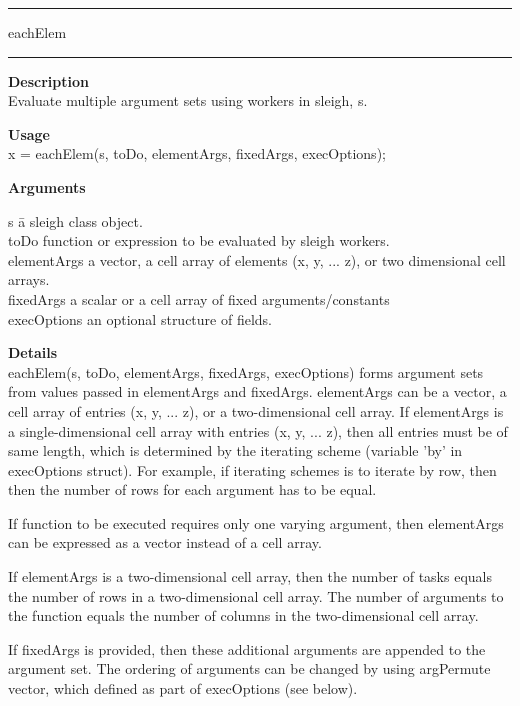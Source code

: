 \rule[0.06in]{6in}{0.01in}
\newline
eachElem
\newline
\rule{6in}{0.01in}
\begin{list}{}{}
	\item {\bf Description}\\
	Evaluate multiple argument sets using workers in sleigh, s. 
	\item {\bf Usage\\}
	x = eachElem(s, toDo, elementArgs, fixedArgs, execOptions);
	\item {\bf Arguments}
		\begin{tabbing}
		s \hspace{2.5cm} \= a sleigh class object.\\
		toDo \> function or expression to be evaluated by sleigh workers. \\
		elementArgs \> a vector, a cell array of elements (x, y, ... z), or two dimensional cell arrays. \\
		fixedArgs \> a scalar or a cell array of fixed arguments/constants \\
		execOptions \> an optional structure of fields.
		\end{tabbing}

	\item {\bf Details}\\
	  eachElem(s, toDo, elementArgs, fixedArgs, execOptions) forms argument sets from values passed in elementArgs and fixedArgs. 
	  elementArgs can be a vector, a cell array of entries (x, y, ... z), or a two-dimensional cell array. 
	  If elementArgs is a single-dimensional cell array with entries (x, y, ... z), 
	  then all entries must be of same length, which is determined by the iterating scheme (variable 'by' in execOptions struct). 
	  For example, if iterating schemes is to iterate by row, then then the number of rows for each argument has to be equal. 

	  If function to be executed requires only one varying argument, then elementArgs can be
	  expressed as a vector instead of a cell array. 

	  If elementArgs is a two-dimensional cell array, then the number of tasks equals
	  the number of rows in a two-dimensional cell array. The number of arguments to the 
	  function equals the number of columns in the two-dimensional cell array.
 
	  If fixedArgs is provided, then these additional arguments are appended to the argument set. 
	  The ordering of arguments can be changed by using argPermute vector, which defined as part of 
	  execOptions (see below).


\end{list}
